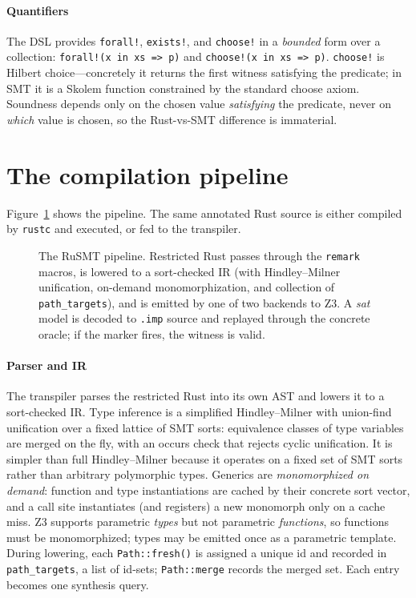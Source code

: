 \documentclass[sigplan,review,anonymous]{acmart}
\theoremstyle{definition}
\theoremstyle{remark}
\newcommand{\rusmt}{RuSMT}
\newcommand{\code}[1]{\texttt{#1}}
\begin{document}
\paragraph{Quantifiers}
The DSL provides \code{forall!}, \code{exists!}, and \code{choose!} in a
\emph{bounded} form over a collection: \code{forall!(x in xs => p)} and
\code{choose!(x in xs => p)}. \code{choose!} is Hilbert choice---concretely it
returns the first witness satisfying the predicate; in SMT it is a Skolem
function constrained by the standard choose axiom. Soundness depends only on the
chosen value \emph{satisfying} the predicate, never on \emph{which} value is
chosen, so the Rust-vs-SMT difference is immaterial.

\section{The compilation pipeline}
\label{sec:pipeline}

Figure~\ref{fig:pipeline} shows the pipeline. The same annotated Rust source is
either compiled by \code{rustc} and executed, or fed to the transpiler.

\begin{figure}[t]
\centering
\resizebox{\columnwidth}{!}{}
\caption{The \rusmt{} pipeline. Restricted Rust passes through the
\code{remark} macros, is lowered to a sort-checked IR (with Hindley--Milner
unification, on-demand monomorphization, and collection of \code{path\_targets}),
and is emitted by one of two backends to Z3. A \emph{sat} model is decoded to
\code{.imp} source and replayed through the concrete oracle; if the marker fires,
the witness is valid.}
\label{fig:pipeline}
\end{figure}

\paragraph{Parser and IR}
The transpiler parses the restricted Rust into its own AST and lowers it to a
sort-checked IR. Type inference is a simplified Hindley--Milner with union-find
unification over a fixed lattice of SMT sorts: equivalence classes of type
variables are merged on the fly, with an occurs check that rejects cyclic
unification. It is simpler than full Hindley--Milner because it operates on a
fixed set of SMT sorts rather than arbitrary polymorphic types. Generics are
\emph{monomorphized on demand}: function and type instantiations are cached by
their concrete sort vector, and a call site instantiates (and registers) a new
monomorph only on a cache miss. Z3 supports parametric \emph{types} but not
parametric \emph{functions}, so functions must be monomorphized; types may be
emitted once as a parametric template. During lowering, each \code{Path::fresh()}
is assigned a unique id and recorded in \code{path\_targets}, a list of id-sets;
\code{Path::merge} records the merged set. Each entry becomes one synthesis query.
\end{document}
